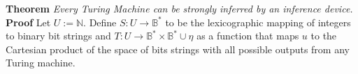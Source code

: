 \documentclass[11pt]{article}
\newcommand{\N}{\mathbb{N}}
\newcommand{\B}{\mathbb{B}}
\begin{document}
 

 
%
% 
% 
 

 
\bigbreak
\textbf{Theorem} \quad \textit{Every Turing Machine can be strongly inferred by an inference device.} \\
\textbf{Proof} \quad Let $ U := \N $. Define $ S: U \rightarrow \B^{*} $ to be the lexicographic mapping of integers to binary bit strings and $ T: U \rightarrow \B^{*} \times \B^{*} \cup \eta$ as a function that maps $u$ to the Cartesian product of the space of bits strings with all possible outputs from any Turing machine. 

\end{document}
